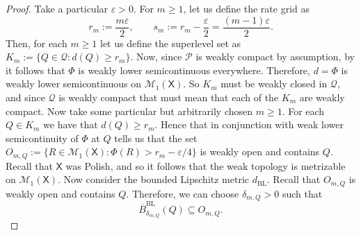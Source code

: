 \documentclass[11pt]{article}
\newcommand{\Pcal}{\mathcal{P}}
\newcommand{\Qcal}{\mathcal{Q}}
\newcommand{\X}{\mathsf{X}}
\theoremstyle{definition}
\theoremstyle{definition}
\begin{document}
\begin{proof}
Take a particular $\varepsilon>0$. For $m\ge 1$, let us define the rate grid as
\[
r_m:=\frac{m\varepsilon}{2},\qquad s_m:=r_m-\frac{\varepsilon}{2}=\frac{(m-1)\varepsilon}{2}.
\]
Then, for each $m\ge 1$ let us define the superlevel set as $K_m:=\{Q\in\Qcal:d(Q)\ge r_m\}$. Now, since $\Pcal$ is weakly compact by assumption, by \parencite[Lemma~3]{ram2026powersequentialtestsexist} it follows that $\Phi$ is weakly lower semicontinuous everywhere. Therefore, $d=\Phi$ is weakly lower semicontinuous on $\mathcal M_1(\X)$. So $K_m$ must be weakly closed in $\Qcal$, and since $\Qcal$ is weakly compact that must mean that each of the $K_m$ are weakly compact. Now take some particular but arbitrarily chosen $m\ge 1$. For each $Q\in K_m$ we have that $d(Q)\ge r_m$. Hence that in conjunction with weak lower semicontinuity of $\Phi$ at $Q$ tells us that the set $O_{m,Q}:=\{R\in\mathcal M_1(\X):\Phi(R)>r_m-\varepsilon/4\}$ is weakly open and contains $Q$. Recall that $\X$ was Polish, and so it follows that the weak topology is metrizable on $\mathcal M_1(\X)$. Now consider the bounded Lipschitz metric $d_{\mathrm{BL}}$. Recall that $O_{m,Q}$ is weakly open and contains $Q$. Therefore, we can choose $\delta_{m,Q}>0$ such that
\[
\overline B^{\mathrm{BL}}_{\delta_{m,Q}}(Q)\subseteq O_{m,Q}.
\]


\end{proof}
\end{document}
